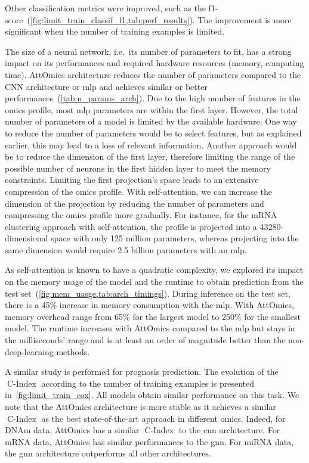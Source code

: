 \documentclass[../main.tex]{subfiles}
\begin{document}
		Other classification metrics were improved, such as the f1-score~(\cref{fig:limit_train_classif_f1,tab:perf_results}).
		The improvement is more significant when the number of training examples is limited.

		The size of a neural network, i.e.\ its number of parameters to fit, has a strong impact on its performances and required hardware resources (memory, computing time).
		AttOmics architecture reduces the number of parameters compared to the CNN architecture or \gls{mlp} and achieves similar or better performances~(\cref{tab:n_params_arch}).
		Due to the high number of features in the omics profile, most \gls{mlp} parameters are within the first layer.
		However, the total number of parameters of a model is limited by the available hardware.
		One way to reduce the number of parameters would be to select features, but as explained earlier, this may lead to a loss of relevant information.
		Another approach would be to reduce the dimension of the first layer, therefore limiting the range of the possible number of neurons in the first hidden layer to meet the memory constraints.
		Limiting the first projection's space leads to an extensive compression of the omics profile.
		With self-attention, we can increase the dimension of the projection by reducing the number of parameters and compressing the omics profile more gradually.
		For instance, for the mRNA clustering approach with self-attention, the profile is projected into a 43280-dimensional space with only 125 million parameters, whereas projecting into the same dimension would require 2.5 billion parameters with an \gls{mlp}.

		As self-attention is known to have a quadratic complexity, we explored its impact on the memory usage of the model and the runtime to obtain prediction from the test set~(\cref{fig:mem_uasge,tab:arch_timings}).
		During inference on the test set, there is a 45\% increase in memory consumption with the \gls{mlp}.
		With AttOmics, memory overhead range from 65\% for the largest model to 250\% for the smallest model.
		The runtime increases with AttOmics compared to the \gls{mlp} but stays in the milliseconds' range and is at least an order of magnitude better than the non-deep-learning methods.


		A similar study is performed for prognosis prediction.
		The evolution of the \(\operatorname{C-Index}\) according to the number of training examples is presented in~\cref{fig:limit_train_cox}.
		All models obtain similar performance on this task.
		We note that the AttOmics architecture is more stable as it achieves a similar \(\operatorname{C-Index}\) as the best state-of-the-art approach in different omics.
		Indeed, for DNAm data, AttOmics has a similar \(\operatorname{C-Index}\) to the \gls{cnn} architecture. For mRNA data, AttOmics has similar performances to the \gls{gnn}.
		For miRNA data, the \gls{gnn} architecture outperforms all other architectures.
\end{document}
